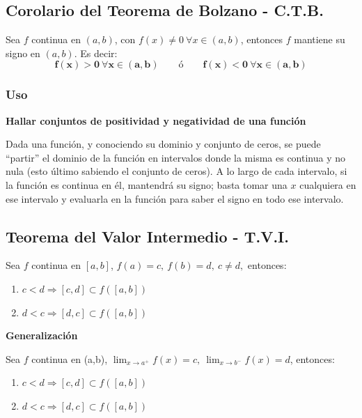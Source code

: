 \documentclass[11pt,titlepage]{article}
\newcommand{\commLim}[2]{\lim_{#1 \to #2}}
\newcommand{\littleTitle}[1]{
	\noindent \ignorespaces
	\small \textbf{#1} \normalsize
	\ignorespaces \ignorespacesafterend
}
\newcommand{\comillas}[1]{``#1''}
\begin{document}
\subsection{Corolario del Teorema de Bolzano - C.T.B.}
\begin{commBoxy}
	Sea $f$ continua en $(a,b)$, con $f(x) \neq 0 \ \forall x \in (a,b)$, entonces $f$ mantiene su signo en $(a,b)$. Es decir:
	\begin{equation}
		\boldsymbol{f(x) > 0 \ \forall x \in (a,b) \qquad \text{ó} \qquad f(x) < 0 \ \forall x \in (a,b)} 
	\end{equation}
\end{commBoxy}

\subsubsection{Uso}
\littleTitle{Hallar conjuntos de positividad y negatividad de una función}\par
Dada una función, y conociendo su dominio y conjunto de ceros, se puede \comillas{partir} el dominio de la función en intervalos donde la misma es
continua y no nula (esto último sabiendo el conjunto de ceros). A lo largo de cada intervalo, si la función es continua en él, mantendrá 
su signo; basta tomar una $x$ cualquiera en ese intervalo y evaluarla en la función para saber el signo en todo ese intervalo.

\subsection{Teorema del Valor Intermedio - T.V.I.}
Sea $f$ continua en $[a,b]$, $f(a) = c, \ f(b) = d, \ c \neq d,$ entonces:
\begin{enumerate}[label=\alph*.]
	\item $c < d \Rightarrow [c,d] \subset f\left([a,b]\right)$
	\item $d < c \Rightarrow [d,c] \subset f\left([a,b]\right)$
\end{enumerate}

\littleTitle{Generalización}\par
Sea $f$ continua en (a,b), $\commLim{x}{a^{+}} f(x) = c, \ \commLim{x}{b^{-}} f(x) = d$, entonces:
\begin{enumerate}[label=\alph*.]
	\item $c < d \Rightarrow [c,d] \subset f\left([a,b]\right)$
	\item $d < c \Rightarrow [d,c] \subset f\left([a,b]\right)$
\end{enumerate}
\end{document}
